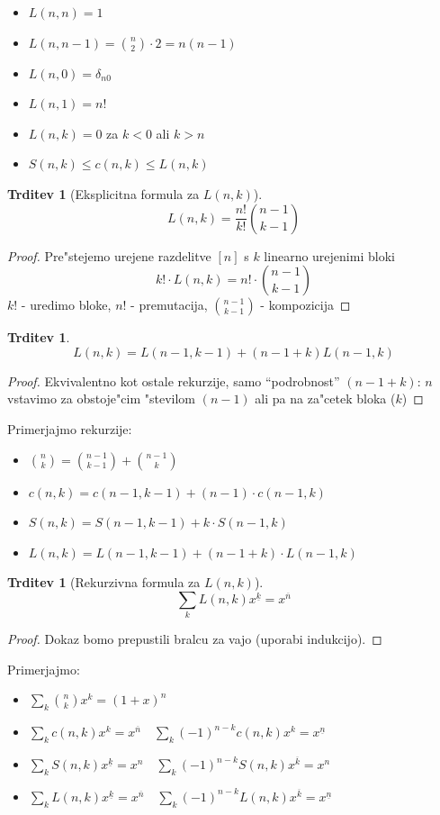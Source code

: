 \documentclass[a4paper,12pt]{article}
\theoremstyle{definition}
\newtheorem{claim}[counter]{Trditev}
\theoremstyle{remark}
\begin{document}
\begin{itemize}
	\item $L(n,n) = 1$
	\item $L(n,n-1) = \binom{n}{2}\cdot 2 = n(n-1)$
	\item $L(n,0) = \delta_{n0}$
	\item $L(n,1) = n!$
	\item $L(n,k) = 0$ za $k < 0$ ali $k > n$
	\item $S(n,k) \leqslant c(n,k) \leqslant L(n,k)$
\end{itemize}

\begin{claim}[Eksplicitna formula za $L(n, k)$]
    \[L(n,k) = \frac{n!}{k!} \binom{n-1}{k-1}\]
\end{claim}
\begin{proof}
    Pre"stejemo urejene razdelitve $[n]$ s $k$ linearno urejenimi bloki
    \[ k! \cdot L(n,k) = n! \cdot \binom{n-1}{k-1} \]
    $k!$ - uredimo bloke, $n!$ - premutacija, $\binom{n-1}{k-1}$ - kompozicija
\end{proof}

\begin{claim}
    \[L(n,k) = L(n-1, k-1) + (n-1+k) L(n-1, k)\]
\end{claim}
\begin{proof}
    Ekvivalentno kot ostale rekurzije, samo ``podrobnost'' $(n-1+k)$: $n$ vstavimo za obstoje"cim "stevilom $(n-1)$ ali pa na za"cetek bloka ($k$)
\end{proof}

Primerjajmo rekurzije:
\begin{itemize}
    \item $\binom{n}{k} = \binom{n-1}{k-1} + \binom{n-1}{k}$
    \item $c(n,k) = c(n-1, k-1) + (n-1) \cdot c(n-1, k)$
    \item $S(n,k) = S(n-1, k-1) + k\cdot S(n-1, k)$
    \item $L(n,k) = L(n-1, k-1) + (n-1+k)\cdot L(n-1, k)$
\end{itemize}

\begin{claim}[Rekurzivna formula za $L(n, k)$]
    \[ \sum_k L(n,k)x^{\underline{k}} = x^{\overline{n}}\]
\end{claim}
\begin{proof}
    Dokaz bomo prepustili bralcu za vajo (uporabi indukcijo).
\end{proof}

Primerjajmo:
\begin{itemize}
    \item $\sum_k \binom{n}{k}x^k = (1+x)^n$
    \item $\sum_k c(n,k)x^k = x^{\overline{n}} \quad \sum_k (-1)^{n-k}c(n,k)x^k = x^{\underline{n}}$
    \item $\sum_k S(n,k)x^{\underline{k}} = x^n \quad \sum_k (-1)^{n-k}S(n,k)x^{\overline{k}} = x^n$
    \item $\sum_k L(n,k)x^{\underline{k}} = x^{\overline{{n}}} \quad \sum_k (-1)^{n-k}L(n,k)x^{\overline{{k}}} = x^{\underline{n}}$
\end{itemize}
\end{document}
